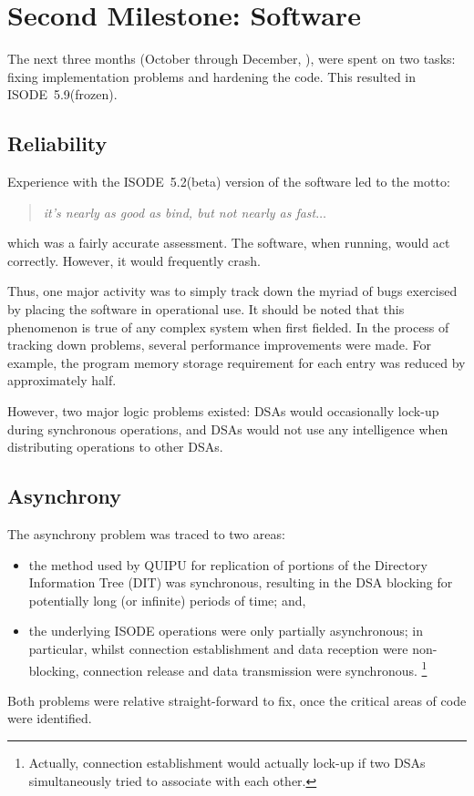 \newpage
\section	{Second Milestone: Software}
The next three months (October through December, {\/}),
were spent on two tasks: fixing implementation problems and hardening the code.
This resulted in ISODE~5.9(frozen).

\subsection	{Reliability}
Experience with the ISODE~5.2(beta) version of the software led to the motto:
\begin{quote}\em
it's nearly as good as bind, but not nearly as fast$\ldots$
\end{quote}
which was a fairly accurate assessment.
The software,
when running,
would act correctly.
However,
it would frequently crash.

Thus, one major activity was to simply track down the myriad of bugs exercised
by placing the software in operational use.
It should be noted that this phenomenon is true of any complex system when
first fielded.
In the process of tracking down problems,
several performance improvements were made.
For example,
the program memory storage requirement for each entry was reduced by
approximately half.

However,
two major logic problems existed:
DSAs would occasionally lock-up during synchronous operations,
and DSAs would not use any intelligence when distributing
operations to other DSAs.

\subsection	{Asynchrony}
The asynchrony problem was traced to two areas:
\begin{itemize}
\item	the method used by QUIPU for replication of portions of the Directory
	Information Tree (DIT) was synchronous,
	resulting in the DSA blocking for potentially long (or infinite)
	periods of time;
	and,

\item	the underlying ISODE operations were only partially asynchronous;
	in particular, whilst connection establishment and data reception were
	non-blocking, connection release and data transmission were
	synchronous.%
	\footnote{Actually,
	connection establishment would actually lock-up if two DSAs
	simultaneously tried to associate with each other.}
\end{itemize}
Both problems were relative straight-forward to fix,
once the critical areas of code were identified.

